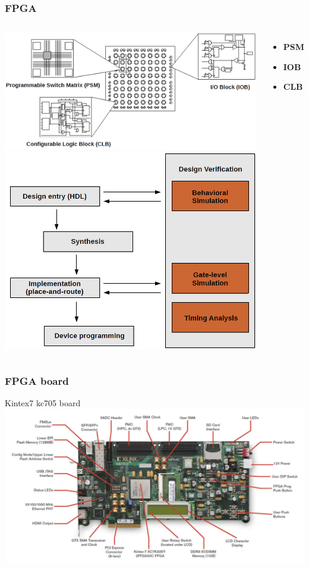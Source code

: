 \documentclass[aspectratio=169]{beamer}
\begin{document}
	\begin{frame}
	\frametitle{FPGA}
	\begin{columns}
		\begin{center}
			\includegraphics[width=0.75 \textwidth]{IMG/FPGA_PARTS.PNG}
			\includegraphics[width=0.65 \textwidth]{IMG/DesignFlow.PNG}
		\end{center}
		\begin{itemize}
			\item \textbf{PSM}
			\item \textbf{IOB}
			\item \textbf{CLB}
		\end{itemize}
	\end{columns}
	\end{frame}

	
	\begin{frame}
	\frametitle{FPGA board }
	\begin{center}
		Kintex7 kc705 board
		\includegraphics[width=0.85 \textwidth]{IMG/KC705.PNG}
	\end{center}
	\end{frame}
\end{document}

